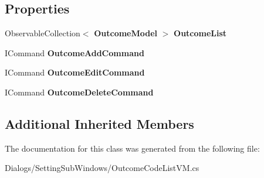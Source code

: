 \subsection*{Properties}
\begin{DoxyCompactItemize}
\item 
\mbox{\label{class_a_f_h___scheduler_1_1_dialogs_1_1_setting_sub_windows_1_1_outcome_code_list_v_m_aae1245cea2c59c345fcd6ec2c5317c36}} 
Observable\+Collection$<$ \textbf{ Outcome\+Model} $>$ {\bfseries Outcome\+List}\hspace{0.3cm}{\ttfamily  [get, set]}
\item 
\mbox{\label{class_a_f_h___scheduler_1_1_dialogs_1_1_setting_sub_windows_1_1_outcome_code_list_v_m_a4162cc8d3c32f9d3df90ebb6110b2aea}} 
I\+Command {\bfseries Outcome\+Add\+Command}\hspace{0.3cm}{\ttfamily  [get]}
\item 
\mbox{\label{class_a_f_h___scheduler_1_1_dialogs_1_1_setting_sub_windows_1_1_outcome_code_list_v_m_a4c7240e6c01424c0b87dc078ec507491}} 
I\+Command {\bfseries Outcome\+Edit\+Command}\hspace{0.3cm}{\ttfamily  [get]}
\item 
\mbox{\label{class_a_f_h___scheduler_1_1_dialogs_1_1_setting_sub_windows_1_1_outcome_code_list_v_m_a816e41e72359eb11db9554402fa8f4cc}} 
I\+Command {\bfseries Outcome\+Delete\+Command}\hspace{0.3cm}{\ttfamily  [get]}
\end{DoxyCompactItemize}
\subsection*{Additional Inherited Members}


The documentation for this class was generated from the following file\+:\begin{DoxyCompactItemize}
\item 
Dialogs/\+Setting\+Sub\+Windows/Outcome\+Code\+List\+V\+M.\+cs\end{DoxyCompactItemize}
